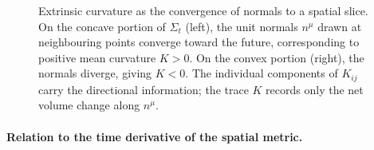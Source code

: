 \begin{figure}[htbp]
  \centering
  
  \caption[Convergence of normals and extrinsic curvature]{%
    Extrinsic curvature as the convergence of normals to a spatial
    slice.  On the concave portion of $\Sigma_t$ (left), the unit
    normals $n^\mu$ drawn at neighbouring points converge toward the
    future, corresponding to positive mean curvature $K > 0$.  On the
    convex portion (right), the normals diverge, giving $K < 0$.  The
    individual components of $K_{ij}$ carry the directional
    information; the trace $K$ records only the net volume change
    along $n^\mu$.}
  \label{fig:adm-extrinsic-curvature}
\end{figure}

\paragraph{Relation to the time derivative of the spatial metric.}

